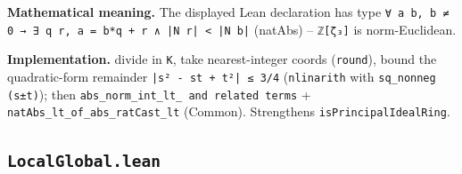 \documentclass[UTF8,a4paper,11pt,fontset=fandol]{ctexart}
\theoremstyle{definition}
\begin{document}
\noindent\textbf{Mathematical meaning.} The displayed Lean declaration has type \texttt{∀ a b, b ≠ 0 → ∃ q r, a = b*q + r ∧ |N r| < |N b|} (natAbs) -- \texttt{ℤ[ζ₃]} is norm-Euclidean.\par
\noindent\textbf{Implementation.} divide in \texttt{K}, take nearest-integer coords (\texttt{round}), bound the quadratic-form remainder \texttt{|s² - st + t²| ≤ 3/\allowbreak{}4} (\texttt{nlinarith} with \texttt{sq\_\allowbreak{}nonneg (s±t)}); then \texttt{abs\_\allowbreak{}norm\_\allowbreak{}int\_\allowbreak{}lt\_\allowbreak{} and related terms} + \texttt{natAbs\_\allowbreak{}lt\_\allowbreak{}of\_\allowbreak{}abs\_\allowbreak{}ratCast\_\allowbreak{}lt} (Common). Strengthens \texttt{isPrincipalIdealRing}.\par

\subsection{\texttt{LocalGlobal.lean}}
\end{document}
